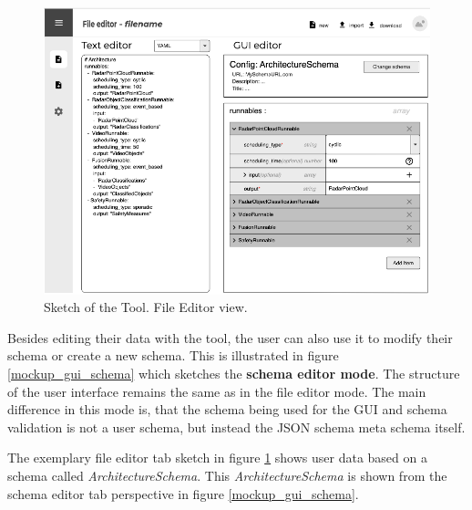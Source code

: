 \begin{figure}[!t]
    \includegraphics[width=\textwidth]{figures/mockup_gui_config}
    \caption{Sketch of the Tool. File Editor view.}
    \label{mockup_gui_config}
\end{figure}



Besides editing their data with the tool, the user can also use it to modify their schema or create a new schema.
This is illustrated in figure \ref{mockup_gui_schema} which sketches the \textbf{schema editor mode}.
The structure of the user interface remains the same as in the file editor mode.
The main difference in this mode is, that the schema being used for the GUI and schema validation is not a user schema, but instead the JSON schema meta schema itself. 

The exemplary file editor tab sketch in figure \ref{mockup_gui_config} shows user data based on a schema called \textit{ArchitectureSchema}.
This \textit{ArchitectureSchema} is shown from the schema editor tab perspective in figure \ref{mockup_gui_schema}.

